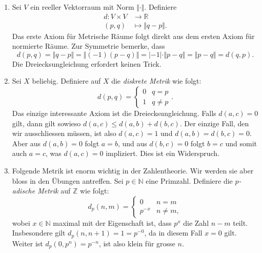 \documentclass[../main.tex]{subfiles}
\begin{document}
\begin{examples}
  \leavevmode
  \begin{enumerate}[(1)]
    \item Sei $V$ ein reeller Vektorraum mit Norm $\Vert \cdot \Vert$.
      Definiere
      \begin{align*}
        d \colon V \times V & \to \mathbb{R} \\
        (p, q) & \mapsto \Vert q - p \Vert.
      \end{align*}
      Das erste Axiom für Metrische Räume folgt direkt aus dem
      ersten Axiom für normierte Räume.
      Zur Symmetrie bemerke, dass
      \[
        d(p, q) = \Vert q - p  \Vert = \Vert (-1)(p - q) \Vert
        = |-1| \cdot \Vert p - q \Vert = \Vert p - q \Vert
        = d(q, p).
      \]
      Die Dreiecksungleichung erfordert keinen Trick.
    \item Sei $X$ beliebig. Definiere auf $X$
      die \emph{diskrete Metrik} wie folgt:
      \[
        d (p, q)
        =
        \begin{cases}
          0 & q = p \\
          1 & q \neq p
        \end{cases}.
      \]
      Das einzige interessante Axiom ist die Dreiecksungleichung.
      Falls $d(a, c) = 0$ gilt, dann gilt sowieso
      $d(a, c) \leq d(a, b) + d(b, c)$.
      Der einzige Fall, den wir ausschliessen müssen, ist also
      $d(a, c) = 1$ und $d(a, b) = d(b, c) = 0$.
      Aber aus $d(a, b) = 0$ folgt $a = b$, und
      aus $d(b, c) = 0$ folgt $b = c$ und somit
      auch $a = c$, was $d(a, c) = 0$ impliziert. Dies ist ein
      Widerspruch.
    \item Folgende Metrik ist enorm wichtig in der Zahlentheorie.
      Wir werden sie aber bloss in den Übungen antreffen.
      Sei $p \in \mathbb{N}$ eine Primzahl.
      Definiere die \emph{$p$-adische Metrik} auf $\mathbb{Z}$
      wie folgt:
      \[
        d_p(n, m) =
        \begin{cases}
          0 & n = m \\
          p^{-x} & n \neq m,
        \end{cases}
      \]
      wobei $x \in \mathbb{N}$ maximal mit der Eigenschaft
      ist, dass
      $p^x$ die Zahl $n -m $ teilt.
      Insbesondere gilt $d_p(n, n + 1) = 1 = p^{-0}$,
      da in diesem Fall $x = 0$ gilt.
      Weiter ist $d_p(0, p^n) = p^{-n}$, ist also klein für
      grosse $n$.
  \end{enumerate}
\end{examples}
\end{document}
